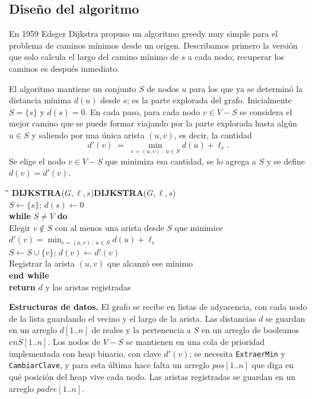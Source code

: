 \documentclass[12pt, spanish, oneside, openany]{book}
\newcommand{\pl}[1]{\makebox[1.6em][r]{\texttt{\footnotesize #1}}\hspace{0.9em}}
\newenvironment{pseudo}[1]{%
  \begin{center}%
  \begin{mdframed}[style=pseudobox]%
  \small
  \begin{tabbing}%
  \hspace{2.5em}\=\hspace{1.5em}\=\hspace{1.5em}\=\hspace{1.5em}\=\hspace{1.5em}\=\kill
  \def\pseudotitulo{#1}\ifx\pseudotitulo\empty\else#1\\[3pt]\fi}%
  {\end{tabbing}\end{mdframed}\end{center}}
\newenvironment{estructuras}%
  {\begin{center}\begin{minipage}{0.93\textwidth}\begin{mdframed}[style=estrbox]%
   \small\textbf{Estructuras de datos.}\;}%
  {\end{mdframed}\end{minipage}\end{center}}
\theoremstyle{uprightplain}
\theoremstyle{definition}
\theoremstyle{remark}
\theoremstyle{definition}
\begin{document}
\subsection{Diseño del algoritmo}

En 1959 Edsger Dijkstra propuso un algoritmo greedy muy simple para el problema de caminos mínimos desde un origen. Describamos primero la versión que solo calcula el largo del camino mínimo de $s$ a cada nodo; recuperar los caminos es después inmediato.

El algoritmo mantiene un conjunto $S$ de nodos $u$ para los que ya se determinó la distancia mínima $d(u)$ desde $s$; es la parte explorada del grafo. Inicialmente $S=\{s\}$ y $d(s)=0$. En cada paso, para cada nodo $v \in V-S$ se considera el mejor camino que se puede formar viajando por la parte explorada hasta algún $u \in S$ y saliendo por una única arista $(u,v)$, es decir, la cantidad
\[
d'(v) \;=\; \min_{e=(u,v)\,:\;u \in S} d(u) + \ell_e .
\]
Se elige el nodo $v \in V-S$ que minimiza esa cantidad, se lo agrega a $S$ y se define $d(v)=d'(v)$.

\begin{pseudo}{\textbf{DIJKSTRA}($G,\ell,s$)}
\pl{1}\> $S \leftarrow \{s\}$; \quad $d(s) \leftarrow 0$\\
\pl{2}\> \textbf{while} $S \neq V$ \textbf{do}\\
\pl{3}\>\> Elegir $v \notin S$ con al menos una arista desde $S$ que minimice\\
\pl{4}\>\>\> $d'(v) = \min_{e=(u,v)\,:\,u\in S} d(u) + \ell_e$\\
\pl{5}\>\> $S \leftarrow S \cup \{v\}$; \quad $d(v) \leftarrow d'(v)$\\
\pl{6}\>\> Registrar la arista $(u,v)$ que alcanzó ese mínimo\\
\pl{7}\> \textbf{end while}\\
\pl{8}\> \textbf{return} $d$ y las aristas registradas
\end{pseudo}

\begin{estructuras}
El grafo se recibe en listas de adyacencia, con cada nodo de la lista guardando
el vecino y el largo de la arista. Las distancias $d$ se guardan en un arreglo
$d[1..n]$ de reales y la pertenencia a $S$ en un arreglo de booleanos
$\mathit{enS}[1..n]$. Los nodos de $V-S$ se mantienen en una cola de prioridad
implementada con heap binario, con clave $d'(v)$; se necesita
\texttt{ExtraerMin} y \texttt{CambiarClave}, y para esta última hace falta un
arreglo $\mathit{pos}[1..n]$ que diga en qué posición del heap vive cada nodo.
Las aristas registradas se guardan en un arreglo $\mathit{padre}[1..n]$.
\end{estructuras}
\end{document}
